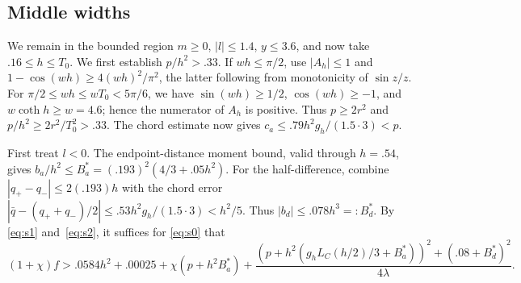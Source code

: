 \subsection{Middle widths}\label{subsec:segments-middle}

We remain in the bounded region $m\ge0$, $|l|\le1.4$, $y\le3.6$, and now take $.16\le h\le T_0$. We first establish $p/h^2>.33$. If $wh\le\pi/2$, use $|A_h|\le1$ and $1-\cos(wh)\ge4(wh)^2/\pi^2$, the latter following from monotonicity of $\sin z/z$. For $\pi/2\le wh\le wT_0<5\pi/6$, we have $\sin(wh)\ge1/2$, $\cos(wh)\ge-1$, and $w\coth h\ge w=4.6$; hence the numerator of $A_h$ is positive. Thus $p\ge2r^2$ and $p/h^2\ge2r^2/T_0^2>.33$. The chord estimate now gives $c_a\le.79h^2g_h/(1.5\cdot3)<p$.

First treat $l<0$. The endpoint-distance moment bound, valid through $h=.54$, gives $b_a/h^2\le B_a^*=(.193)^2(4/3+.05h^2)$. For the half-difference, combine $|q_+-q_-|\le2(.193)h$ with the chord error $|\bar q-(q_++q_-)/2|\le.53h^2g_h/(1.5\cdot3)<h^2/5$. Thus $|b_d|\le.078h^3=:B_d^*$. By \eqref{eq:s1} and~\eqref{eq:s2}, it suffices for \eqref{eq:s0} that
\begin{equation}
 (1+\chi)f>
 .0584 h^2+.00025+\chi(p+h^2 B_a^*)+
 \frac{(p+h^2(g_h L_C(h/2)/3+B_a^*))^2+(.08+B_d^*)^2}{4\lambda}.                  \tag{s4}\label{eq:s4}
\end{equation}

